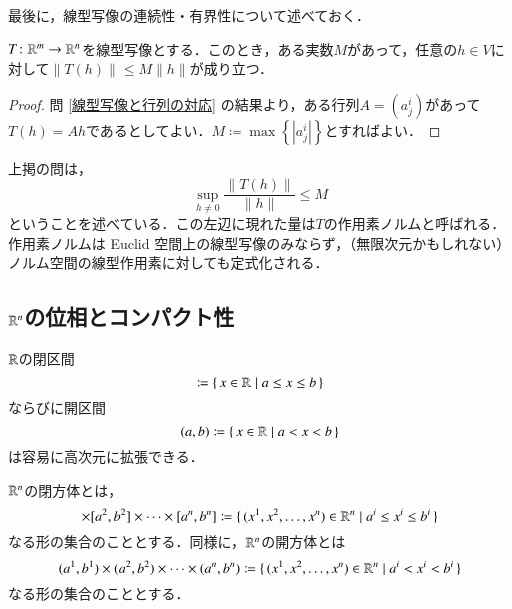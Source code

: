 最後に，線型写像の連続性・有界性について述べておく．

\begin{lem}\label{線型写像の連続性}
$T \colon \mathbb{R}^m \to \mathbb{R}^n$を線型写像とする．このとき，ある実数$M$があって，任意の$h \in V$に対して$\|T(h)\| \leq M \|h\|$が成り立つ．
\end{lem}

\begin{proof}
問 \ref{線型写像と行列の対応} の結果より，ある行列$A = \left(a^i_j\right)$があって$T(h) = Ah$であるとしてよい．$M \coloneqq \max \left\{\left|a^i_j\right|\right\} $とすればよい．
\end{proof}

\begin{que}[*]上掲の問は，
\begin{equation}
\sup_{h \neq 0} \frac{\|T(h)\|}{\|h\|} \leq M
\end{equation}
ということを述べている．この左辺に現れた量は$T$の作用素ノルムと呼ばれる．作用素ノルムは Euclid 空間上の線型写像のみならず，（無限次元かもしれない）ノルム空間の線型作用素に対しても定式化される．
\end{que}

\subsection{$\mathbb{R}^n$の位相とコンパクト性}

$\mathbb{R}$の閉区間
\begin{equation}
[a,b] \coloneqq \set{x \in \Real | a \leq x \leq b}
\end{equation}ならびに開区間
\begin{equation}
(a,b) \coloneqq \set{x \in \mathbb{R}| a < x < b}
\end{equation}
は容易に高次元に拡張できる．

\begin{defi}
$\mathbb{R}^n$の閉方体とは，
\begin{equation}
[a^1,b^1] \times [a^2, b^2] \times \dots \times [a^n, b^n] \coloneqq \set{(x^1, x^2, \dots, x^n) \in \Real^n | a^i \leq x^i \leq b^i }
\end{equation}なる形の集合のこととする．同様に，$\mathbb{R}^n$の開方体とは
\begin{equation}
(a^1,b^1) \times (a^2, b^2) \times \dots \times (a^n, b^n) \coloneqq \set{(x^1, x^2, \dots, x^n) \in \mathbb{R}^n | a^i < x^i < b^i }
\end{equation}なる形の集合のこととする．
\end{defi}

